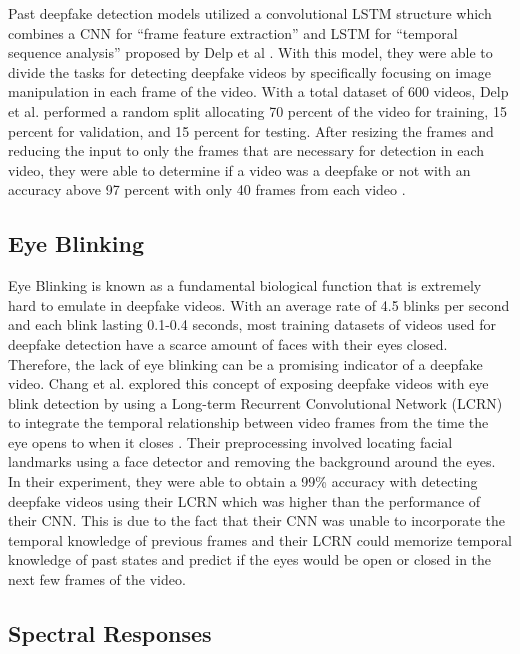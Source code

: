 \documentclass[a4paper]{article}
\begin{document}
Past deepfake detection models utilized a convolutional LSTM structure which combines a CNN for “frame feature extraction” and LSTM for “temporal sequence analysis” proposed by Delp et al \cite{Delp}. With this model, they were able to divide the tasks for detecting deepfake videos by specifically focusing on image manipulation in each frame of the video. With a total dataset of 600 videos, Delp et al. performed a random split allocating 70 percent of the video for training, 15 percent for validation, and 15 percent for testing. After resizing the frames and reducing the input to only the frames that are necessary for detection in each video, they were able to determine if a video was a deepfake or not with an accuracy above 97 percent with only 40 frames from each video \cite{Delp}.

\subsection{Eye Blinking}

Eye Blinking is known as a fundamental biological function that is extremely hard to emulate in deepfake videos. With an average rate of 4.5 blinks per second and each blink lasting 0.1-0.4 seconds, most training datasets of videos used for deepfake detection have a scarce amount of faces with their eyes closed. Therefore, the lack of eye blinking can be a promising indicator of a deepfake video. Chang et al. explored this concept of exposing deepfake videos with eye blink detection by using a Long-term Recurrent Convolutional Network (LCRN) to integrate the temporal relationship between video frames from the time the eye opens to when it closes \cite{eye}. Their preprocessing involved locating facial landmarks using a face detector and removing the background around the eyes. In their experiment, they were able to obtain a 99\% accuracy with detecting deepfake videos using their LCRN which was higher than the performance of their CNN. This is due to the fact that their CNN was unable to incorporate the temporal knowledge of previous frames and their LCRN could memorize temporal knowledge of past states and predict if the eyes would be open or closed in the next few frames of the video.

\subsection{Spectral Responses}
\end{document}
